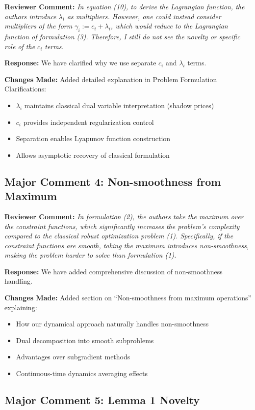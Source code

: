 \documentclass[11pt]{article}
\newcommand{\reviewercomment}[1]{\textbf{Reviewer Comment:} \textit{#1}}
\newcommand{\response}[1]{\textbf{Response:} #1}
\newcommand{\changes}[1]{\textbf{Changes Made:} #1}
\begin{document}
\reviewercomment{In equation (10), to derive the Lagrangian function, the authors introduce $\lambda_i$ as multipliers. However, one could instead consider multipliers of the form $\gamma_i := c_i + \lambda_i$, which would reduce to the Lagrangian function of formulation (3). Therefore, I still do not see the novelty or specific role of the $c_i$ terms.}

\response{We have clarified why we use separate $c_i$ and $\lambda_i$ terms.}

\changes{Added detailed explanation in Problem Formulation Clarifications:
\begin{itemize}
\item $\lambda_i$ maintains classical dual variable interpretation (shadow prices)
\item $c_i$ provides independent regularization control
\item Separation enables Lyapunov function construction
\item Allows asymptotic recovery of classical formulation
\end{itemize}
}

\subsection*{Major Comment 4: Non-smoothness from Maximum}

\reviewercomment{In formulation (2), the authors take the maximum over the constraint functions, which significantly increases the problem's complexity compared to the classical robust optimization problem (1). Specifically, if the constraint functions are smooth, taking the maximum introduces non-smoothness, making the problem harder to solve than formulation (1).}

\response{We have added comprehensive discussion of non-smoothness handling.}

\changes{Added section on ``Non-smoothness from maximum operations'' explaining:
\begin{itemize}
\item How our dynamical approach naturally handles non-smoothness
\item Dual decomposition into smooth subproblems
\item Advantages over subgradient methods
\item Continuous-time dynamics averaging effects
\end{itemize}
}

\subsection*{Major Comment 5: Lemma 1 Novelty}
\end{document}
